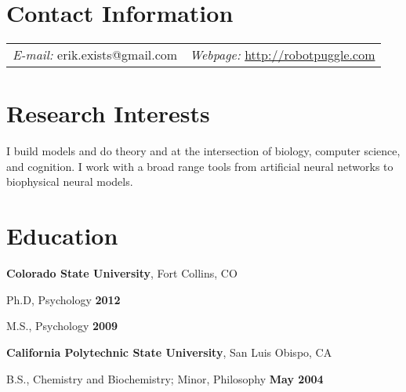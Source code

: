 \documentclass[margin,line]{res}
\newenvironment{list1}{
  \begin{list}{\ding{113}}{%
      \setlength{\itemsep}{0in}
      \setlength{\parsep}{0in} \setlength{\parskip}{0in}
      \setlength{\topsep}{0in} \setlength{\partopsep}{0in}
      \setlength{\leftmargin}{0.17in}}}{\end{list}}
\begin{document}
\newcommand{\link}[1]{\texttt{#1}}
\providecommand{\tightlist}{%
      \setlength{\itemsep}{0pt}\setlength{\parskip}{0pt}}



\begin{resume}
\section{\sc Contact Information}
\vspace{.05in}
\begin{tabular}{@{}p{2in}p{4in}}
{\it E-mail:}  erik.exists@gmail.com   & {\it Webpage:} \href{http://robotpuggle.com}{http://robotpuggle.com} \\
\end{tabular}


\section{\sc Research Interests}
I build models and do theory and at the intersection of biology, computer science, and cognition. I work with a broad range tools from artificial neural networks to biophysical neural models.


\section{\sc Education}
{\bf Colorado State University}, Fort Collins, CO\\
\vspace*{-.1in}
\begin{list1}
\item[] Ph.D, Psychology \hfill {\bf 2012}
\item[] M.S., Psychology \hfill {\bf 2009}
\end{list1}

{\bf California Polytechnic State University}, San Luis Obispo, CA\\
\vspace*{-.1in}
\begin{list1}
\item[] B.S., Chemistry and Biochemistry; Minor, Philosophy \hfill {\bf May 2004}
\end{list1}



\end{resume}
\end{document}
